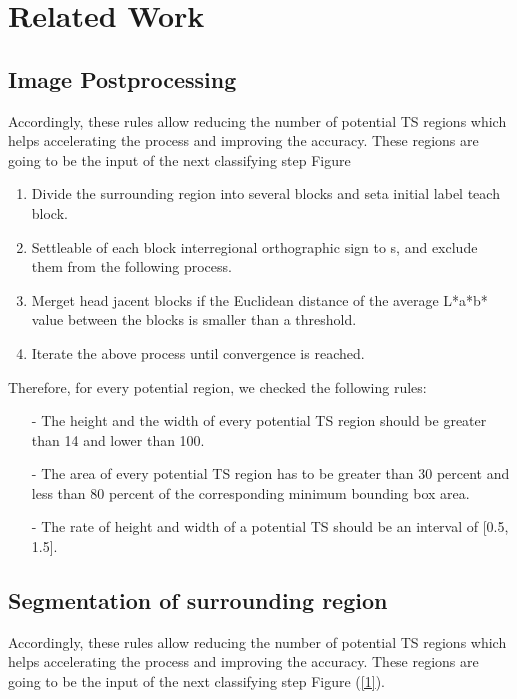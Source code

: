 \documentclass[11pt]{article}
\begin{document}
\tableofcontents
\newpage
\section{Related Work}
\subsection{Image Postprocessing}  

Accordingly, these rules allow reducing the number of potential TS regions which helps accelerating the process and improving the accuracy. These regions are going to be the input of the next classifying step Figure \par
\noindent

\begin{enumerate}
\item Divide the surrounding region into several blocks and seta initial label teach block.
\item Settleable of each block interregional orthographic sign to s, and exclude them from the following process.
\item Merget head jacent blocks if the Euclidean distance of the average L*a*b* value between the blocks is smaller than a threshold.
\item Iterate the above process until convergence is reached.
\end{enumerate}

Therefore, for every potential region, we checked the following rules: \par
\noindent

\begin{itemize}
    \item[-] The height and the width of every potential TS region should be greater than 14 and lower than 100.
    \item[-] The area of every potential TS region has to be greater than 30 percent and less than 80 percent of the corresponding minimum bounding box area.
    \item[-] The rate of height and width of a potential TS should be an interval of [0.5, 1.5].
\end{itemize}

\subsection{Segmentation of surrounding region}

 Accordingly, these rules allow reducing the number of potential TS regions which helps accelerating the process and improving the accuracy. These regions are going to be the input of the next classifying step Figure (\ref{1}). \par
\end{document}
